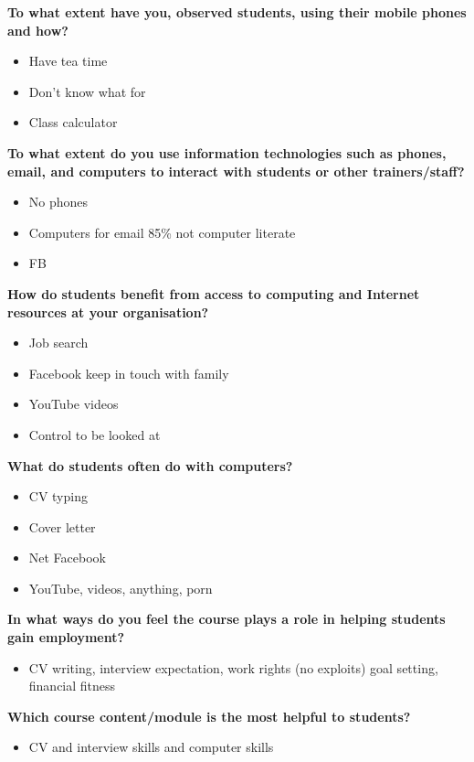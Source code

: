\noindent\textbf{To what extent have you, observed students, using their mobile phones and how?}
\begin{itemize}
\item Have tea time
\item Don’t know what for
\item Class calculator
\end{itemize}

\noindent\textbf{To what extent do you use information technologies such as phones, email, and computers to interact with students or other trainers/staff?}
\begin{itemize}
\item No phones
\item Computers for email 85\% not computer literate
\item FB
\end{itemize}

\noindent\textbf{How do students benefit from access to computing and Internet resources at your organisation?}
\begin{itemize}
\item Job search
\item Facebook keep in touch with family
\item YouTube videos
\item Control to be looked at
\end{itemize}

\noindent\textbf{What do students often do with computers?}
\begin{itemize}
\item CV typing
\item Cover letter
\item Net Facebook
\item YouTube, videos, anything, porn
\end{itemize}



\noindent\textbf{In what ways do you feel the course plays a role in helping students gain employment?}
\begin{itemize}
\item CV writing, interview expectation, work rights (no exploits) goal setting, financial fitness
\end{itemize}

\noindent\textbf{Which course content/module is the most helpful to students?}
\begin{itemize}
\item CV and interview skills and computer skills
\end{itemize}

